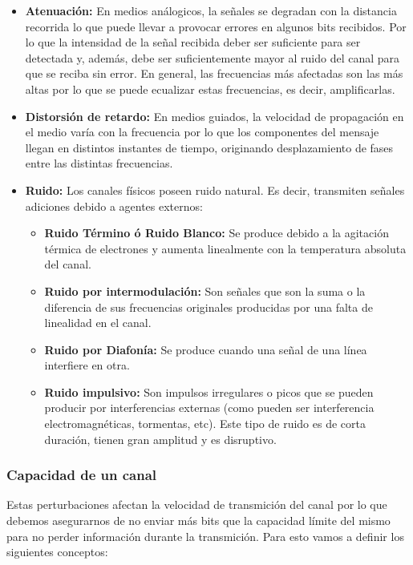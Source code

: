 \documentclass[10pt,a4paper]{article}
\begin{document}
\begin{itemize}
  \item \textbf{Atenuación:}  En medios análogicos, la señales se degradan con la distancia recorrida lo que puede llevar a provocar errores en algunos bits recibidos. Por lo que la intensidad de la señal recibida deber ser suficiente para ser detectada y, además, debe ser suficientemente mayor al ruido del canal para que se reciba sin error. En general, las frecuencias más afectadas son las más altas por lo que se puede ecualizar estas frecuencias, es decir, amplificarlas.
  \item \textbf{Distorsión de retardo:} En medios guiados, la velocidad de propagación en el medio varía con la frecuencia por lo que los componentes del mensaje llegan en distintos instantes de tiempo, originando desplazamiento de fases entre las distintas frecuencias.
\item \textbf{Ruido:} Los canales físicos poseen ruido natural. Es decir, transmiten señales adiciones debido a agentes externos:
\begin{itemize}
  \item \textbf{Ruido Término ó Ruido Blanco:} Se produce debido a la agitación térmica de electrones y aumenta linealmente con la temperatura absoluta del canal.
  \item\textbf{Ruido por intermodulación:} Son señales que son la suma o la diferencia de sus frecuencias originales producidas por una falta de linealidad en el canal.
  \item\textbf{Ruido por Diafonía:} Se produce cuando una señal de una línea interfiere en otra.
  \item\textbf{Ruido impulsivo:} Son impulsos irregulares o picos que se pueden producir por interferencias externas (como pueden ser interferencia electromagnéticas, tormentas, etc). Este tipo de ruido es de corta duración, tienen gran amplitud y es disruptivo.
\end{itemize}
\end{itemize}

\subsubsection{Capacidad de un canal}
Estas perturbaciones afectan la velocidad de transmición del canal por lo que debemos asegurarnos de no enviar más bits que la capacidad límite del mismo para no perder información durante la transmición. Para esto vamos a definir los siguientes conceptos:
\end{document}
